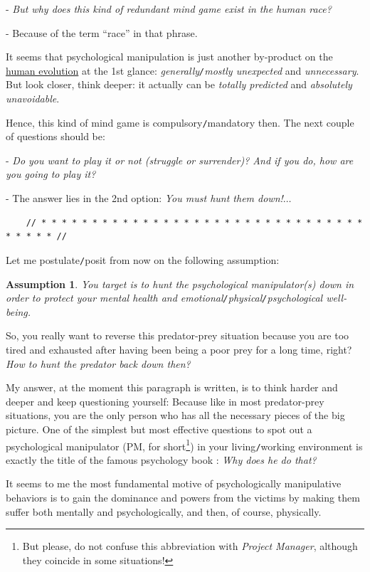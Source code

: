 \documentclass[12pt]{article}
\numberwithin{equation}{section}
\newtheorem{assumption}{Assumption}[section]
\begin{document}
- \textit{But why does this kind of redundant mind game exist in the human race?}

- Because of the term ``race'' in that phrase.

It seems that psychological manipulation is just another by-product on the \href{https://en.wikipedia.org/wiki/Human_evolution}{human evolution} at the 1st glance: \textit{generally\texttt{/}mostly unexpected} and \textit{unnecessary}. But look closer, think deeper: it actually can be \textit{totally predicted} and \textit{absolutely unavoidable}.

Hence, this kind of mind game is compulsory\texttt{/}mandatory then. The next couple of questions should be:

- \textit{Do you want to play it or not (struggle or surrender)? And if you do, how are you going to play it?}

- The answer lies in the 2nd option: \textit{You must hunt them down!$\ldots$}

\begin{verbatim}
    // * * * * * * * * * * * * * * * * * * * * * * * * * * * * * * * * * * * * * //
\end{verbatim}

\noindent
{} Let me postulate\texttt{/}posit from now on the following assumption:

\begin{assumption}
    You target is to hunt the psychological manipulator(s) down in order to protect your mental health and emotional\texttt{/}physical\texttt{/}psychological well-being.
\end{assumption}
So, you really want to reverse this predator-prey situation because you are too tired and exhausted after having been being a poor prey for a long time, right? \textit{How to hunt the predator back down then?}

My answer, at the moment this paragraph is written, is to think harder and deeper and keep questioning yourself: Because like in most predator-prey situations, you are the only person who has all the necessary pieces of the big picture. One of the simplest but most effective questions to spot out a psychological manipulator (PM, for short\footnote{But please, do not confuse this abbreviation with \textit{Project Manager}, although they coincide in some situations!}) in your living\texttt{/}working environment is exactly the title of the famous psychology book \cite{Bancroft2003}: \textit{Why does he do that?}

It seems to me the most fundamental motive of psychologically manipulative behaviors is to gain the dominance and powers from the victims by making them suffer both mentally and psychologically, and then, of course, physically. 
\end{document}
